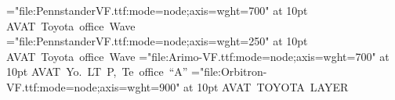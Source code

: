 \font\pr="file:PennstanderVF.ttf:mode=node;axis={wght=700}" at 10pt
\hbox{\pr AVAT Toyota office Wave}
\font\pl="file:PennstanderVF.ttf:mode=node;axis={wght=250}" at 10pt
\hbox{\pl AVAT Toyota office Wave}
\font\ab="file:Arimo-VF.ttf:mode=node;axis={wght=700}" at 10pt
\hbox{\ab AVAT Yo. LT P, Te office ``A''}
\font\ob="file:Orbitron-VF.ttf:mode=node;axis={wght=900}" at 10pt
\hbox{\ob AVAT TOYOTA LAYER}

